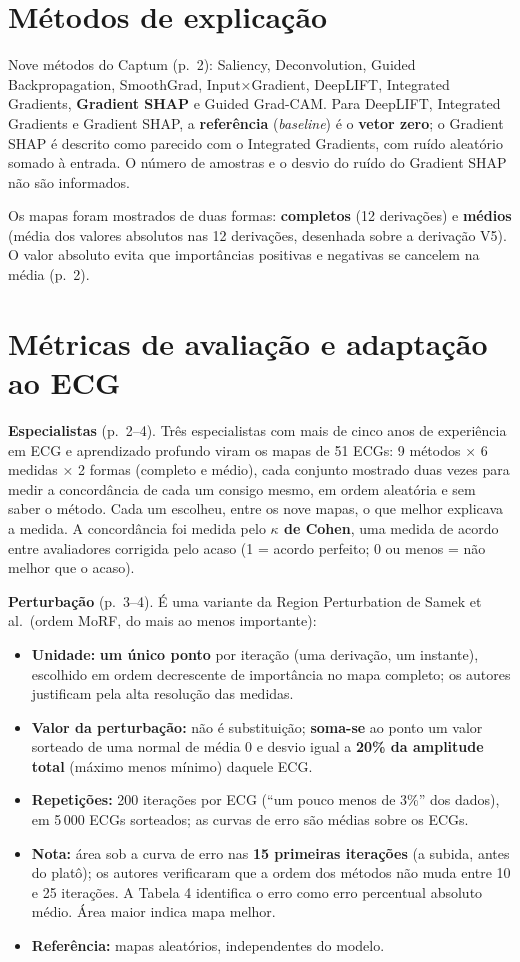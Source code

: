 \documentclass[11pt,a4paper]{article}
\begin{document}
\section{Métodos de explicação}
Nove métodos do Captum (p.~2): Saliency, Deconvolution, Guided Backpropagation, SmoothGrad, Input×Gradient, DeepLIFT, Integrated Gradients, \textbf{Gradient SHAP} e Guided Grad-CAM. Para DeepLIFT, Integrated Gradients e Gradient SHAP, a \textbf{referência} (\textit{baseline}) é o \textbf{vetor zero}; o Gradient SHAP é descrito como parecido com o Integrated Gradients, com ruído aleatório somado à entrada. O número de amostras e o desvio do ruído do Gradient SHAP não são informados.

Os mapas foram mostrados de duas formas: \textbf{completos} (12 derivações) e \textbf{médios} (média dos valores absolutos nas 12 derivações, desenhada sobre a derivação V5). O valor absoluto evita que importâncias positivas e negativas se cancelem na média (p.~2).

\section{Métricas de avaliação e adaptação ao ECG}
\textbf{Especialistas} (p.~2--4). Três especialistas com mais de cinco anos de experiência em ECG e aprendizado profundo viram os mapas de 51 ECGs: 9 métodos × 6 medidas × 2 formas (completo e médio), cada conjunto mostrado duas vezes para medir a concordância de cada um consigo mesmo, em ordem aleatória e sem saber o método. Cada um escolheu, entre os nove mapas, o que melhor explicava a medida. A concordância foi medida pelo \textbf{$\kappa$ de Cohen}, uma medida de acordo entre avaliadores corrigida pelo acaso (1 = acordo perfeito; 0 ou menos = não melhor que o acaso).

\textbf{Perturbação} (p.~3--4). É uma variante da Region Perturbation de Samek et al.\ (ordem MoRF, do mais ao menos importante):
\begin{itemize}
\item \textbf{Unidade:} \textbf{um único ponto} por iteração (uma derivação, um instante), escolhido em ordem decrescente de importância no mapa completo; os autores justificam pela alta resolução das medidas.
\item \textbf{Valor da perturbação:} não é substituição; \textbf{soma-se} ao ponto um valor sorteado de uma normal de média 0 e desvio igual a \textbf{20\% da amplitude total} (máximo menos mínimo) daquele ECG.
\item \textbf{Repetições:} 200 iterações por ECG (“um pouco menos de 3\%” dos dados), em 5\,000 ECGs sorteados; as curvas de erro são médias sobre os ECGs.
\item \textbf{Nota:} área sob a curva de erro nas \textbf{15 primeiras iterações} (a subida, antes do platô); os autores verificaram que a ordem dos métodos não muda entre 10 e 25 iterações. A Tabela 4 identifica o erro como erro percentual absoluto médio. Área maior indica mapa melhor.
\item \textbf{Referência:} mapas aleatórios, independentes do modelo.
\end{itemize}
\end{document}
